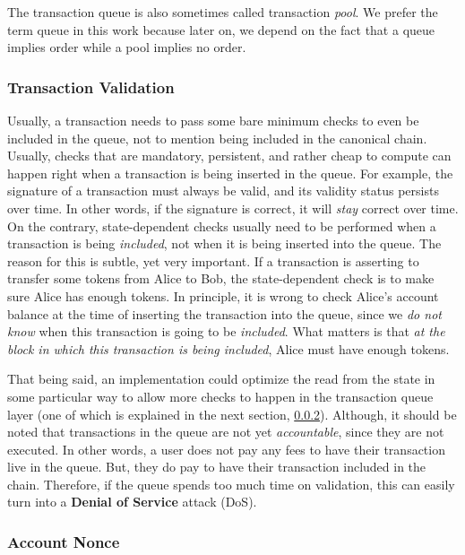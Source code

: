 \begin{remark}
	The transaction queue is also sometimes called transaction \textit{pool}. We prefer the term
	queue in this work because later on, we depend on the fact that a queue implies order while a
	pool implies no order.
\end{remark}

\subsubsection{Transaction Validation} \label{chap_bg:subsec:validation}

Usually, a transaction needs to pass some bare minimum checks to even be included in the queue, not
to mention being included in the canonical chain. Usually, checks that are mandatory, persistent,
and rather cheap to compute can happen right when a transaction is being inserted in the queue. For
example, the signature of a transaction must always be valid, and its validity status persists over
time. In other words, if the signature is correct, it will \textit{stay} correct over time. On the
contrary, state-dependent checks usually need to be performed when a transaction is being
\textit{included}, not when it is being inserted into the queue. The reason for this is subtle, yet
very important. If a transaction is asserting to transfer some tokens from Alice to Bob, the
state-dependent check is to make sure Alice has enough tokens. In principle, it is wrong to check
Alice's account balance at the time of inserting the transaction into the queue, since we \textit{do
not know} when this transaction is going to be \textit{included}. What matters is that \textit{at
the block in which this transaction is being included}, Alice must have enough tokens.

That being said, an implementation could optimize the read from the state in some particular way to
allow more checks to happen in the transaction queue layer (one of which is explained in the next
section, \ref{chap_bg:subsec:nonce}). Although, it should be noted that transactions in the queue
are not yet \textit{accountable}, since they are not executed. In other words, a user does not pay
any fees to have their transaction live in the queue. But, they do pay to have their transaction
included in the chain. Therefore, if the queue spends too much time on validation, this can easily
turn into a \textbf{Denial of Service} attack (DoS).

\subsubsection{Account Nonce} \label{chap_bg:subsec:nonce}

